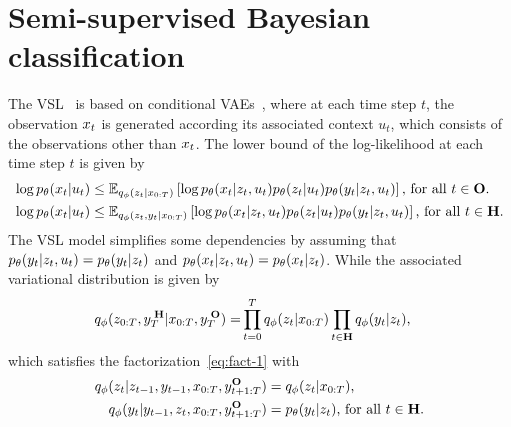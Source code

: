 \chapter{Semi-supervised Bayesian classification}
\label{chap:appendix3}
The VSL~\citep{chen2019variational} is based on conditional 
VAEs~\citep{pagnoni2018conditional},
where at each time step $t$, the observation $x_t$ is generated
according its associated context $u_t$, which consists of the observations
other than $x_t$. 
The lower bound of the log-likelihood at each time step $t$ is given by
\begin{align*}
    \log p_{\theta}(x_t | u_t) &\leq 
    {\mathbb{E}}_{q_\phi(z_t|x_{0:T})} 
    \left[ \log p_{\theta}(x_t | z_t, u_t)p_{\theta}(z_t|u_t) p_{\theta}(y_t|z_t, u_t)   \right]
    \text{, for all } t \in \mathbf{O} \text{.}\\
    \log p_{\theta}(x_t | u_t) &\leq 
    {\mathbb{E}}_{q_\phi(z_t, y_t |x_{0:T})} 
    \left[ \log p_{\theta}(x_t | z_t, u_t)p_{\theta}(z_t|u_t) p_{\theta}(y_t|z_t, u_t)  \right]
    \text{, for all } t \in \mathbf{H}  \text{.}
\end{align*}
The VSL model simplifies some dependencies by assuming that
$p_{\theta}(y_t|z_t, u_t) = p_{\theta}(y_t|z_t)$ and 
$p_{\theta}(x_t | z_t, u_t) = p_{\theta}(x_t | z_t)$.
While the associated variational distribution is given by
\begin{align*}  
q_\phi(z_{0:T}, y_{T}^{\;\mathbf{H}}| x_{0:T}, y_{T}^{\;\mathbf{O}}) =& \prod_{t=0}^T 
q_\phi(z_t| x_{0:T}) \prod_{t\in  \mathbf{H}}  q_\phi(y_t| z_t) \text{,}
\end{align*}
 which satisfies  the factorization~\eqref{eq:fact-1}
with
\begin{align*}
 q_\phi(z_t|z_{t-1},y_{t-1},x_{0:T},y_{t+1:T}^{\mathbf{O}})
 &=q_\phi(z_t|x_{0:T}) \text{,} \\
 q_\phi(y_t|y_{t-1},z_t,x_{0:T},y_{t+1:T}^{\mathbf{O}})
 &=p_{\theta}(y_t|z_t) \text{, for all } t \in \mathbf{H} \text{.}
\end{align*}

